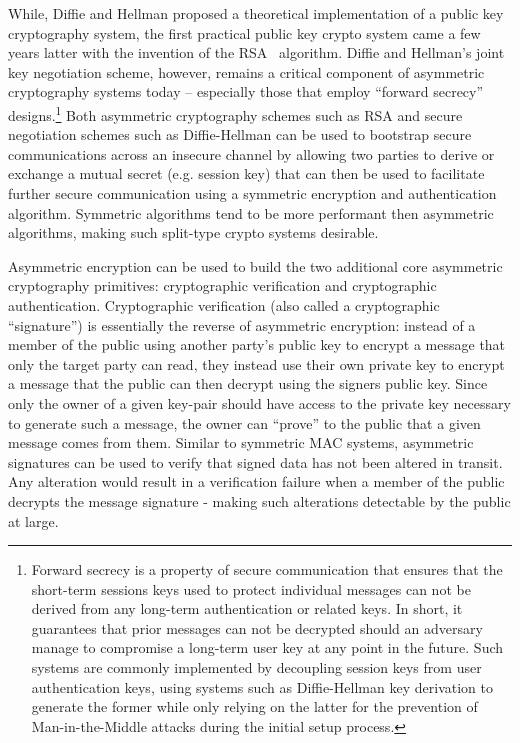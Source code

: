 While, Diffie and Hellman proposed a theoretical implementation of a
public key cryptography system, the first practical public key crypto
system came a few years latter with the invention of the
RSA~\cite{rivest1978} algorithm. Diffie and Hellman's joint key
negotiation scheme, however, remains a critical component of
asymmetric cryptography systems today -- especially those that employ
``forward secrecy'' designs.\footnote{Forward secrecy is a property of
  secure communication that ensures that the short-term sessions keys
  used to protect individual messages can not be derived from any
  long-term authentication or related keys. In short, it guarantees
  that prior messages can not be decrypted should an adversary manage
  to compromise a long-term user key at any point in the future. Such
  systems are commonly implemented by decoupling session keys from
  user authentication keys, using systems such as Diffie-Hellman key
  derivation to generate the former while only relying on the latter
  for the prevention of Man-in-the-Middle attacks during the initial
  setup process.} Both asymmetric cryptography schemes such as RSA and
secure negotiation schemes such as Diffie-Hellman can be used to
bootstrap secure communications across an insecure channel by allowing
two parties to derive or exchange a mutual secret (e.g. session key)
that can then be used to facilitate further secure communication using
a symmetric encryption and authentication algorithm. Symmetric
algorithms tend to be more performant then asymmetric algorithms,
making such split-type crypto systems desirable.

Asymmetric encryption can be used to build the two additional core
asymmetric cryptography primitives: cryptographic verification and
cryptographic authentication. Cryptographic verification (also called
a cryptographic ``signature'') is essentially the reverse of
asymmetric encryption: instead of a member of the public using another
party's public key to encrypt a message that only the target party can
read, they instead use their own private key to encrypt a message that
the public can then decrypt using the signers public key. Since only
the owner of a given key-pair should have access to the private key
necessary to generate such a message, the owner can ``prove'' to the
public that a given message comes from them. Similar to symmetric MAC
systems, asymmetric signatures can be used to verify that signed data
has not been altered in transit. Any alteration would result in a
verification failure when a member of the public decrypts the message
signature - making such alterations detectable by the public at large.

